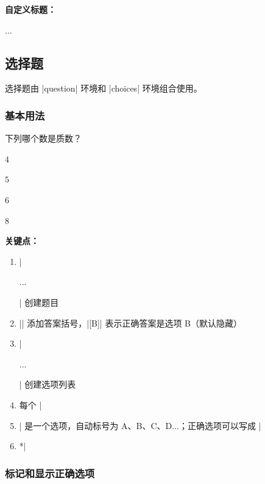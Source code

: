 \textbf{自定义标题：}

\begin{latexcode}
  \begin{notice}[label = {考生须知：}]
    \item ...
  \end{notice}
\end{latexcode}


\subsection{选择题}

选择题由 |question| 环境和 |choices| 环境组合使用。

\subsubsection{基本用法}

\begin{latexcode}
  \begin{question}
    下列哪个数是质数？\paren[B]
    \begin{choices}
      \item $4$
      \item* $5$  %
      \item $6$
      \item $8$
    \end{choices}
  \end{question}
\end{latexcode}

\textbf{关键点：}
\begin{enumerate}
  \item |\begin{question}...\end{question}| 创建题目
  \item |\paren[B]| 添加答案括号，|[B]| 表示正确答案是选项 B（默认隐藏）
  \item |\begin{choices}...\end{choices}| 创建选项列表
  \item 每个 |\item| 是一个选项，自动标号为 A、B、C、D...；正确选项可以写成 |\item*|
\end{enumerate}

\subsubsection{标记和显示正确选项}

